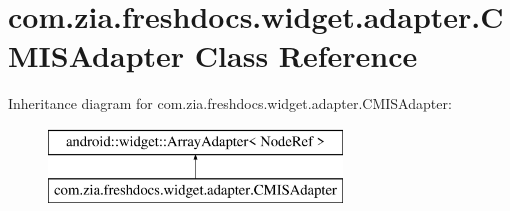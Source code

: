 \hypertarget{classcom_1_1zia_1_1freshdocs_1_1widget_1_1adapter_1_1_c_m_i_s_adapter}{\section{com.\-zia.\-freshdocs.\-widget.\-adapter.\-C\-M\-I\-S\-Adapter Class Reference}
\label{classcom_1_1zia_1_1freshdocs_1_1widget_1_1adapter_1_1_c_m_i_s_adapter}
}
Inheritance diagram for com.\-zia.\-freshdocs.\-widget.\-adapter.\-C\-M\-I\-S\-Adapter\-:\begin{figure}[H]
\begin{center}
\leavevmode
\includegraphics[height=2.000000cm]{classcom_1_1zia_1_1freshdocs_1_1widget_1_1adapter_1_1_c_m_i_s_adapter}
\end{center}
\end{figure}

